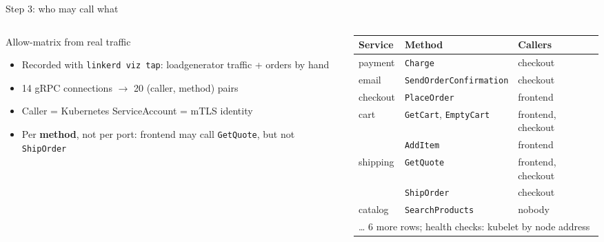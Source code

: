 \documentclass[9pt,aspectratio=169]{beamer}
\begin{document}
\begin{frame}{Step 3: who may call what}
  \begin{columns}[T,onlytextwidth]
    \begin{column}{0.46\textwidth}
      \begin{block}{Allow-matrix from real traffic}
        \begin{itemize}\setlength{\itemsep}{2pt}
          \item Recorded with \texttt{linkerd viz tap}: loadgenerator traffic + orders by hand
          \item 14 gRPC connections $\to$ 20 (caller, method) pairs
          \item Caller = Kubernetes ServiceAccount = mTLS identity
          \item Per \textbf{method}, not per port: frontend may call \texttt{GetQuote}, but not \texttt{ShipOrder}
        \end{itemize}
      \end{block}
    \end{column}
    \begin{column}{0.52\textwidth}
      \centering
      {\scriptsize
      \begin{tabular}{lll}
        \toprule
        \textbf{Service} & \textbf{Method} & \textbf{Callers} \\
        \midrule
        payment  & \texttt{Charge}                & checkout \\
        email    & \texttt{SendOrderConfirmation} & checkout \\
        checkout & \texttt{PlaceOrder}            & frontend \\
        cart     & \texttt{GetCart}, \texttt{EmptyCart} & frontend, checkout \\
                 & \texttt{AddItem}               & frontend \\
        shipping & \texttt{GetQuote}              & frontend, checkout \\
                 & \texttt{ShipOrder}             & checkout \\
        catalog  & \texttt{SearchProducts}        & \alert{nobody} \\
        \multicolumn{3}{l}{\tiny \ldots{} 6 more rows; health checks: kubelet by node address} \\
        \bottomrule
      \end{tabular}}
    \end{column}
  \end{columns}
\end{frame}
\end{document}
